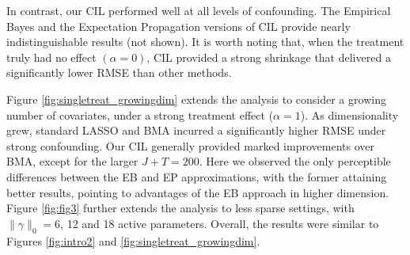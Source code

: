 \documentclass[12pt]{article}
\def\cred{\textcolor{red}}
\newcommand{\norm}[1]{\lVert#1\rVert}
\begin{document}
In contrast, our CIL performed well at all levels of confounding.
The Empirical Bayes and the Expectation Propagation versions of CIL provide nearly indistinguishable results (not shown).
It is worth noting that, when the treatment truly had no effect $(\alpha = 0)$, CIL provided a strong shrinkage that delivered a significantly lower RMSE than other methods.


Figure \ref{fig:singletreat_growingdim} extends the analysis to consider a growing number of covariates, under a strong treatment effect ($\alpha=1$). As dimensionality grew, standard LASSO and BMA incurred a significantly higher RMSE under strong confounding. Our CIL generally provided marked improvements over BMA, except for the larger $J+T=200$.
Here we observed the only perceptible differences between the EB and EP approximations, with the former attaining better results, pointing to advantages of the EB approach in higher dimension. Figure \ref{fig:fig3} further extends the analysis to less sparse settings, with $\norm{\gamma}_{0}=6$, 12 and 18 active parameters. Overall, the results were similar to Figures \ref{fig:intro2} and \ref{fig:singletreat_growingdim}.
\end{document}
